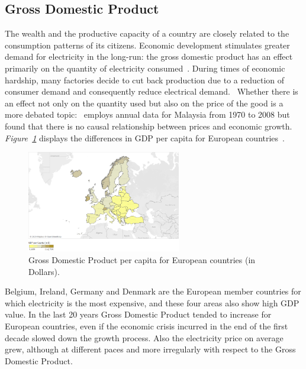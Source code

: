 \documentclass[a4paper,12pt]{book}
\begin{document}
\subsection{Gross Domestic Product}

The wealth and the productive capacity of a country are closely related to the consumption patterns of its citizens. Economic development stimulates greater demand for electricity in the long-run: the gross domestic product has an effect primarily on the quantity of electricity consumed~\cite{jamil2010relationship}. During times of economic hardship, many factories decide to cut back production due to a reduction of consumer demand and consequently reduce electrical demand.~\cite{g} Whether there is an effect not only on the quantity used but also on the price of the good is a more debated topic:~\cite{lean2010multivariate} employs annual data for Malaysia from 1970 to 2008 but found that there is no causal relationship between prices and economic growth. \textit{Figure~\ref{fig:GDP}} displays the differences in GDP per capita for European countries~\cite{GDP}.

\begin{figure}[tb]
\begin{center}
\captionsetup{justification=centering}
\includegraphics[width=0.6\textwidth]{Images/gdp.png}
\caption{Gross Domestic Product per capita for European countries (in Dollars).}
\label{fig:GDP}
\end{center}
\end{figure}

Belgium, Ireland, Germany and Denmark are the European member countries for which electricity is the most expensive, and these four areas also show high GDP value. In the last 20 years Gross Domestic Product tended to increase for European countries, even if the economic crisis incurred in the end of the first decade slowed down the growth process. Also the electricity price on average grew, although at different paces and more irregularly with respect to the Gross Domestic Product.
\end{document}
